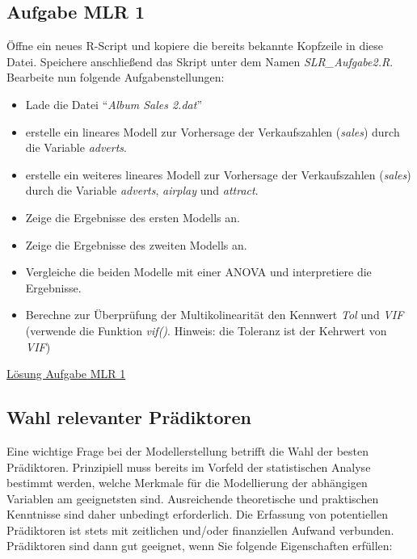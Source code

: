\documentclass[]{article}
\providecommand{\tightlist}{%
  \setlength{\itemsep}{0pt}\setlength{\parskip}{0pt}}
\begin{document}
\hypertarget{aufgabe-mlr-1}{%
\subsection*{Aufgabe MLR 1}\label{aufgabe-mlr-1}}

Öffne ein neues R-Script und kopiere die bereits bekannte Kopfzeile in diese Datei. Speichere anschließend das Skript unter dem Namen \emph{SLR\_Aufgabe2.R}. Bearbeite nun folgende Aufgabenstellungen:

\begin{itemize}
\tightlist
\item
  Lade die Datei ``\emph{Album Sales 2.dat}''
\item
  erstelle ein lineares Modell zur Vorhersage der Verkaufszahlen (\emph{sales}) durch die Variable \emph{adverts}.
\item
  erstelle ein weiteres lineares Modell zur Vorhersage der Verkaufszahlen (\emph{sales}) durch die Variable \emph{adverts}, \emph{airplay} und \emph{attract}.
\item
  Zeige die Ergebnisse des ersten Modells an.
\item
  Zeige die Ergebnisse des zweiten Modells an.
\item
  Vergleiche die beiden Modelle mit einer ANOVA und interpretiere die Ergebnisse.
\item
  Berechne zur Überprüfung der Multikolinearität den Kennwert \emph{Tol} und \emph{VIF} (verwende die Funktion \emph{vif()}. Hinweis: die Toleranz ist der Kehrwert von \emph{VIF})
\end{itemize}

\protect\hyperlink{aufgabe-mlr-1-lsg}{Lösung Aufgabe MLR 1}

\hypertarget{wahl-relevanter-pradiktoren}{%
\subsection*{Wahl relevanter Prädiktoren}\label{wahl-relevanter-pradiktoren}}

Eine wichtige Frage bei der Modellerstellung betrifft die Wahl der besten Prädiktoren. Prinzipiell muss bereits im Vorfeld der statistischen Analyse bestimmt werden, welche Merkmale für die Modellierung der abhängigen Variablen am geeignetsten sind. Ausreichende theoretische und praktischen Kenntnisse sind daher unbedingt erforderlich. Die Erfassung von potentiellen Prädiktoren ist stets mit zeitlichen und/oder finanziellen Aufwand verbunden. Prädiktoren sind dann gut geeignet, wenn Sie folgende Eigenschaften erfüllen:
\end{document}
